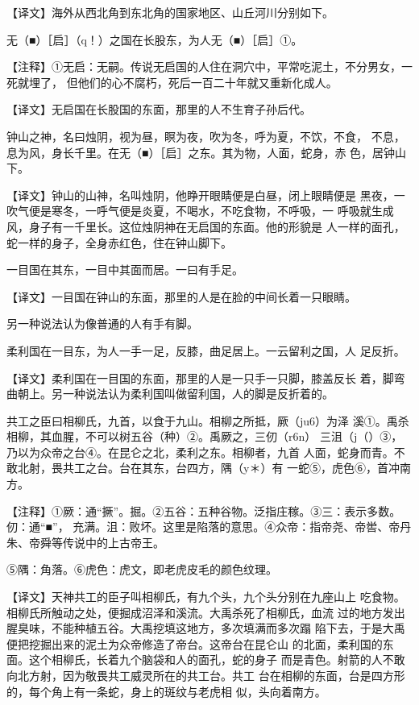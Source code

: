 \documentclass[a4paper,12pt,UTF8,twoside]{ctexbook}
\begin{document}
【译文】海外从西北角到东北角的国家地区、山丘河川分别如下。

无（■）［启］（q！）之国在长股东，为人无（■）［启］①。

【注释】①无启：无嗣。传说无启国的人住在洞穴中，平常吃泥土，不分男女，一死就埋了， 但他们的心不腐朽，死后一百二十年就又重新化成人。

【译文】无启国在长股国的东面，那里的人不生育子孙后代。

钟山之神，名曰烛阴，视为昼，瞑为夜，吹为冬，呼为夏，不饮，不食， 不息，息为风，身长千里。在无（■）［启］之东。其为物，人面，蛇身，赤 色，居钟山下。

【译文】钟山的山神，名叫烛阴，他睁开眼睛便是白昼，闭上眼睛便是 黑夜，一吹气便是寒冬，一呼气便是炎夏，不喝水，不吃食物，不呼吸，一 呼吸就生成风，身子有一千里长。这位烛阴神在无启国的东面。他的形貌是 人一样的面孔，蛇一样的身子，全身赤红色，住在钟山脚下。

一目国在其东，一目中其面而居。一曰有手足。

【译文】一目国在钟山的东面，那里的人是在脸的中间长着一只眼睛。

另一种说法认为像普通的人有手有脚。

柔利国在一目东，为人一手一足，反膝，曲足居上。一云留利之国，人 足反折。

【译文】柔利国在一目国的东面，那里的人是一只手一只脚，膝盖反长 着，脚弯曲朝上。另一种说法认为柔利国叫做留利国，人的脚是反折着的。

共工之臣曰相柳氏，九首，以食于九山。相柳之所抵，厥（ju6）为泽 溪①。禹杀相柳，其血腥，不可以树五谷（种）②。禹厥之，三仞（r6n） 三沮（j（）③，乃以为众帝之台④。在昆仑之北，柔利之东。相柳者，九首 人面，蛇身而青。不敢北射，畏共工之台。台在其东，台四方，隅（y＊）有 一蛇⑤，虎色⑥，首冲南方。

【注释】①厥：通“撅”。掘。②五谷：五种谷物。泛指庄稼。③三：表示多数。仞：通“■”， 充满。沮：败坏。这里是陷落的意思。④众帝：指帝尧、帝喾、帝丹朱、帝舜等传说中的上古帝王。

⑤隅：角落。⑥虎色：虎文，即老虎皮毛的颜色纹理。

【译文】天神共工的臣子叫相柳氏，有九个头，九个头分别在九座山上 吃食物。相柳氏所触动之处，便掘成沼泽和溪流。大禹杀死了相柳氏，血流 过的地方发出腥臭味，不能种植五谷。大禹挖填这地方，多次填满而多次蹋 陷下去，于是大禹便把挖掘出来的泥土为众帝修造了帝台。这帝台在昆仑山 的北面，柔利国的东面。这个相柳氏，长着九个脑袋和人的面孔，蛇的身子 而是青色。射箭的人不敢向北方射，因为敬畏共工威灵所在的共工台。共工 台在相柳的东面，台是四方形的，每个角上有一条蛇，身上的斑纹与老虎相 似，头向着南方。
\end{document}

